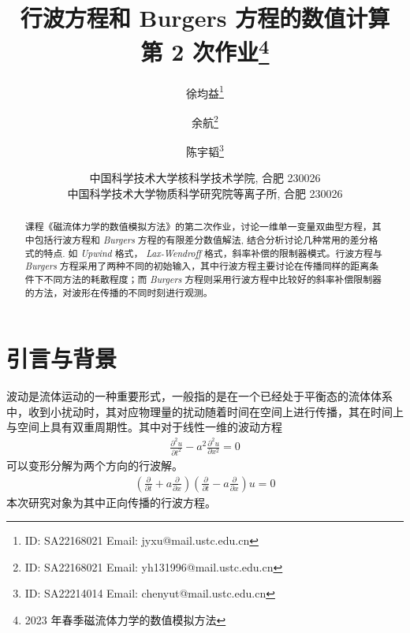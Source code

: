 \documentclass[10.5pt
]{article}
\def\Term{2023 年春季}
\def\Course{磁流体力学的数值模拟方法}
\begin{document}
\title{行波方程和 Burgers 方程的数值计算 \\
  第 2 次作业\footnote{\Term\Course}}

\author{徐均益\footnote{ID: SA22168021 Email: jyxu@mail.ustc.edu.cn}
  \and
  余航\footnote{ID: SA22168021 Email: yh131996@mail.ustc.edu.cn}
  \and
  陈宇韬\footnote{ID: SA22214014 Email: chenyut@mail.ustc.edu.cn}
}

\date{%
\scriptsize%
中国科学技术大学核科学技术学院, 合肥 230026 \\
中国科学技术大学物质科学研究院等离子所, 合肥 230026
%
}


\maketitle

\begin{abstract}
课程《磁流体力学的数值模拟方法》的第二次作业，讨论一维单一变量双曲型方程，其中包括行波方程和 \textit{Burgers} 方程的有限差分数值解法,
结合分析讨论几种常用的差分格式的特点. 如 \textit{Upwind} 格式， \textit{Lax-Wendroff} 格式，斜率补偿的限制器模式。行波方程与 \textit{Burgers} 方程采用了两种不同的初始输入，其中行波方程主要讨论在传播同样的距离条件下不同方法的耗散程度；而 \textit{Burgers} 方程则采用行波方程中比较好的斜率补偿限制器的方法，对波形在传播的不同时刻进行观测。
\end{abstract}

\section{引言与背景}
波动是流体运动的一种重要形式，一般指的是在一个已经处于平衡态的流体体系中，收到小扰动时，其对应物理量的扰动随着时间在空间上进行传播，其在时间上与空间上具有双重周期性。其中对于线性一维的波动方程
\begin{align}
\frac{\partial^2 u}{\partial t^2} - a^2 \frac{\partial^2 u}{\partial x^2} = 0
\label{EqnCon}
\end{align}
可以变形分解为两个方向的行波解。
\begin{align}
\left( \frac{\partial }{\partial t} + a \frac{\partial }{\partial x} \right) \left( \frac{\partial }{\partial t} - a \frac{\partial }{\partial x} \right) u= 0
\end{align}
本次研究对象为其中正向传播的行波方程。
\end{document}
